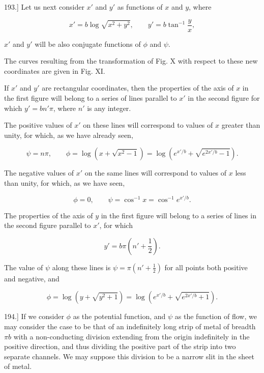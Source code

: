 \documentclass[11pt,a4paper]{article}
\begin{document}
193.] Let us next consider $x'$ and $y'$ as functions of $x$ and $y$, where

\begin{equation}\tag{6}
x' = b\log\sqrt{x^2+y^2}, \qquad y' = b\tan^{-1}\frac{y}{x},
\end{equation}

$x'$ and $y'$ will be also conjugate functions of $\phi$ and $\psi$.

The curves resulting from the transformation of Fig. X with respect to these new coordinates are given in Fig. XI.

If $x'$ and $y'$ are rectangular coordinates, then the properties of the
axis of $x$ in the first figure will belong to a series of lines parallel
to $x'$ in the second figure for which $y'=bn'\pi$, where $n'$ is any
integer.

The positive values of $x'$ on these lines will correspond to values of
$x$ greater than unity, for which, as we have already seen,

\begin{equation}\tag{7}
\psi=n\pi,\qquad
\phi=\log\left(x+\sqrt{x^2-1}\right)
=\log\left(e^{x'/b}+\sqrt{e^{2x'/b}-1}\right).
\end{equation}

\setcounter{footnote}{0}
The negative values of $x'$ on the same lines will correspond to
values of $x$ less than unity, for which, as we have seen,

\begin{equation}\tag{8}
\phi=0,\qquad \psi=\cos^{-1}x=\cos^{-1}e^{x'/b}.
\end{equation}

The properties of the axis of $y$ in the first figure will belong to
a series of lines in the second figure parallel to $x'$, for which

\begin{equation}\tag{9}
y' = b\pi (n' + \frac{1}{2}).
\end{equation}

The value of $\psi$ along these lines is
$\psi=\pi(n'+\frac{1}{2})$ for all points both positive and negative,
and

\begin{equation}\tag{10}
\phi=\log\left(y+\sqrt{y^2+1}\right)
=\log\left(e^{x'/b}+\sqrt{e^{2x'/b}+1}\right).
\end{equation}

194.] If we consider $\phi$ as the potential function, and $\psi$ as
the function of flow, we may consider the case to be that of an
indefinitely long strip of metal of breadth $\pi b$ with a
non-conducting division extending from the origin indefinitely in the
positive direction, and thus dividing the positive part of the strip
into two separate channels. We may suppose this division to be a narrow
slit in the sheet of metal.
\end{document}
